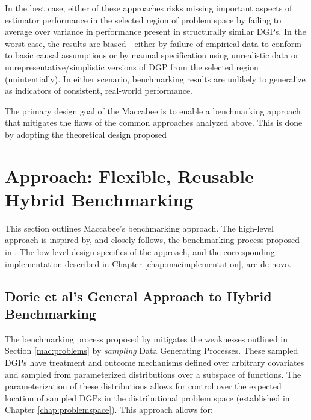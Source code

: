 \documentclass[../main.tex]{subfiles}
\begin{document}
\vspace{\baselineskip}

In the best case, either of these approaches risks missing important aspects of estimator performance in the selected region of problem space by failing to average over variance in performance present in structurally similar DGPs. In the worst case, the results are biased - either by failure of empirical data to conform to basic causal assumptions or by manual specification using unrealistic data or unrepresentative/simplistic versions of DGP from the selected region (unintentially). In either scenario, benchmarking results are unlikely to generalize as indicators of consistent, real-world performance.

\vspace{\baselineskip}

The primary design goal of the Maccabee is to enable a benchmarking approach that mitigates the flaws of the common approaches analyzed above. This is done by adopting the theoretical design proposed \cite{Dorie2019Automated1}

\section{Approach: Flexible, Reusable Hybrid Benchmarking}
\label{mac:approach}

This section outlines Maccabee's benchmarking approach. The high-level approach is inspired by, and closely follows, the benchmarking process proposed in \cite{Dorie2019Automated1}. The low-level design specifics of the approach, and the corresponding implementation described in Chapter \ref{chap:macimplementation}, are de novo.

\subsection{Dorie et al's General Approach to Hybrid Benchmarking}
\label{mac:generalapproach}

The benchmarking process proposed by \cite{Dorie2019Automated1} mitigates the weaknesses outlined in Section \ref{mac:problems} by \textit{sampling} Data Generating Processes. These sampled DGPs have treatment and outcome mechanisms defined over arbitrary covariates and sampled from parameterized distributions over a subspace of functions. The parameterization of these distributions allows for control over the expected location of sampled DGPs in the distributional problem space (established in Chapter \ref{chap:problemspace}). This approach allows for:
\end{document}
